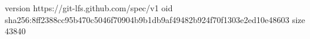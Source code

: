 version https://git-lfs.github.com/spec/v1
oid sha256:8ff2388cc95b470c5046f70904b9b1db9af49482b924f70f1303e2ed10e48603
size 43840
